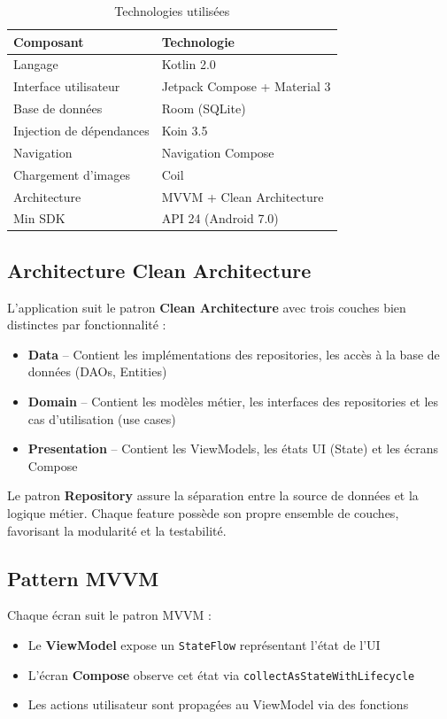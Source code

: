 \documentclass[12pt,a4paper]{article}
\begin{document}
\begin{table}[h]
\centering
\begin{tabular}{ll}
\toprule
\textbf{Composant} & \textbf{Technologie} \\
\midrule
Langage & Kotlin 2.0 \\
Interface utilisateur & Jetpack Compose + Material 3 \\
Base de donn\'ees & Room (SQLite) \\
Injection de d\'ependances & Koin 3.5 \\
Navigation & Navigation Compose \\
Chargement d'images & Coil \\
Architecture & MVVM + Clean Architecture \\
Min SDK & API 24 (Android 7.0) \\
\bottomrule
\end{tabular}
\caption{Technologies utilis\'ees}
\end{table}

\subsection{Architecture Clean Architecture}

L'application suit le patron \textbf{Clean Architecture} avec trois couches bien distinctes par fonctionnalit\'e :

\begin{itemize}
    \item \textbf{Data} -- Contient les impl\'ementations des repositories, les acc\`es \`a la base de donn\'ees (DAOs, Entities)
    \item \textbf{Domain} -- Contient les mod\`eles m\'etier, les interfaces des repositories et les cas d'utilisation (use cases)
    \item \textbf{Presentation} -- Contient les ViewModels, les \'etats UI (State) et les \'ecrans Compose
\end{itemize}

Le patron \textbf{Repository} assure la s\'eparation entre la source de donn\'ees et la logique m\'etier. Chaque feature poss\`ede son propre ensemble de couches, favorisant la modularit\'e et la testabilit\'e.

\subsection{Pattern MVVM}

Chaque \'ecran suit le patron MVVM :
\begin{itemize}
    \item Le \textbf{ViewModel} expose un \texttt{StateFlow} repr\'esentant l'\'etat de l'UI
    \item L'\'ecran \textbf{Compose} observe cet \'etat via \texttt{collectAsStateWithLifecycle}
    \item Les actions utilisateur sont propag\'ees au ViewModel via des fonctions
\end{itemize}
\end{document}
